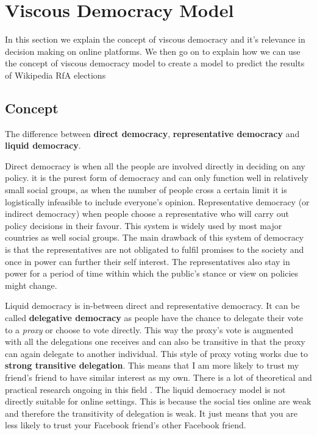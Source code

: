 \section{Viscous Democracy Model}
\label{sec:model}
In this section we explain the concept of viscous democracy \cite{ViscousDemocracy} and it's relevance in decision making on online platforms. We then go on to explain how we can use the concept of viscous democracy model to create a model to predict the results of Wikipedia RfA elections

\subsection{Concept}
The difference between \textbf{direct democracy}, \textbf{representative democracy} and \textbf{liquid democracy}.

Direct democracy is when all the people are involved directly in deciding on any policy. it is the purest form of democracy and can only function well in relatively small social groups, as when the number of people cross a certain limit it is logistically infeasible to include everyone's opinion. Representative democracy (or indirect democracy) when people choose a representative who will carry out policy decisions in their favour. This system is widely used by most major countries as well social groups. The main drawback of this system of democracy is that the representatives are not obligated to fulfil promises to the society and once in power can further their self interest. The representatives also stay in power for a period of time within which the public's stance or view on policies might change.

Liquid democracy is in-between direct and representative democracy. It can be called \textbf{delegative democracy} as people have the chance to delegate their vote to a \textit{proxy} or choose to vote directly. This way the proxy's vote is augmented with all the delegations one receives and can also be transitive in that the proxy can again delegate to another individual. This style of proxy voting works due to \textbf{strong transitive delegation}. This means that I am more likely to trust my friend's friend to have similar interest as my own. There is a lot of theoretical and practical research ongoing in this field \cite{kahng2018liquid,hardt2015google}. The liquid democracy model is not directly suitable for online settings. This is because the social ties online are weak and therefore the transitivity of delegation is weak. It just means that you are less likely to trust your Facebook friend's other Facebook friend. 

